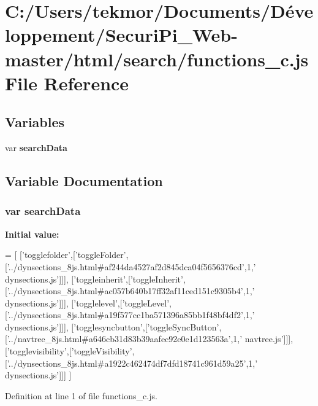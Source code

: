 \section{C\+:/\+Users/tekmor/\+Documents/\+Développement/\+Securi\+Pi\+\_\+\+Web-\/master/html/search/functions\+\_\+c.js File Reference}
\label{functions__c_8js}
\subsection*{Variables}
\begin{DoxyCompactItemize}
\item 
var {\bf search\+Data}
\end{DoxyCompactItemize}


\subsection{Variable Documentation}
\subsubsection[{search\+Data}]{\setlength{\rightskip}{0pt plus 5cm}var search\+Data}\label{functions__c_8js_ad01a7523f103d6242ef9b0451861231e}
{\bfseries Initial value\+:}
\begin{DoxyCode}
=
[
  [\textcolor{stringliteral}{'togglefolder'},[\textcolor{stringliteral}{'toggleFolder'},[\textcolor{stringliteral}{'../dynsections\_8js.html#af244da4527af2d845dca04f5656376cd'},1,\textcolor{stringliteral}{'
      dynsections.js'}]]],
  [\textcolor{stringliteral}{'toggleinherit'},[\textcolor{stringliteral}{'toggleInherit'},[\textcolor{stringliteral}{'../dynsections\_8js.html#ac057b640b17ff32af11ced151c9305b4'},1,\textcolor{stringliteral}{'
      dynsections.js'}]]],
  [\textcolor{stringliteral}{'togglelevel'},[\textcolor{stringliteral}{'toggleLevel'},[\textcolor{stringliteral}{'../dynsections\_8js.html#a19f577cc1ba571396a85bb1f48bf4df2'},1,\textcolor{stringliteral}{'
      dynsections.js'}]]],
  [\textcolor{stringliteral}{'togglesyncbutton'},[\textcolor{stringliteral}{'toggleSyncButton'},[\textcolor{stringliteral}{'../navtree\_8js.html#a646cb31d83b39aafec92e0e1d123563a'},1,\textcolor{stringliteral}{'
      navtree.js'}]]],
  [\textcolor{stringliteral}{'togglevisibility'},[\textcolor{stringliteral}{'toggleVisibility'},[\textcolor{stringliteral}{'../dynsections\_8js.html#a1922c462474df7dfd18741c961d59a25'},1,\textcolor{stringliteral}{'
      dynsections.js'}]]]
]
\end{DoxyCode}


Definition at line 1 of file functions\+\_\+c.\+js.

